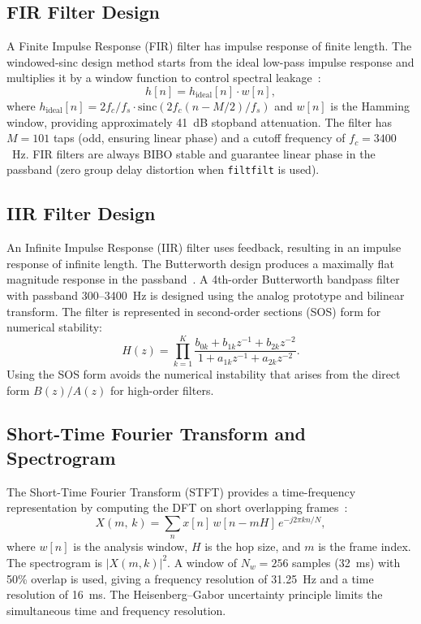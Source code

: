 \documentclass[journal]{IEEEtran}
\begin{document}
\subsection{FIR Filter Design}

A Finite Impulse Response (FIR) filter has impulse response of finite length.
The windowed-sinc design method starts from the ideal low-pass impulse response
and multiplies it by a window function to control spectral leakage~\cite{harris1978}:
\begin{equation}
  h[n] = h_{\text{ideal}}[n] \cdot w[n],
  \label{eq:fir}
\end{equation}
where $h_{\text{ideal}}[n] = 2f_c / f_s \cdot \text{sinc}(2f_c(n - M/2)/f_s)$
and $w[n]$ is the Hamming window, providing approximately 41~dB stopband
attenuation. The filter has $M = 101$ taps (odd, ensuring linear phase) and a
cutoff frequency of $f_c = 3400$~Hz. FIR filters are always BIBO stable and
guarantee linear phase in the passband (zero group delay distortion when
\texttt{filtfilt} is used).

\subsection{IIR Filter Design}

An Infinite Impulse Response (IIR) filter uses feedback, resulting in an
impulse response of infinite length. The Butterworth design produces a maximally
flat magnitude response in the passband~\cite{proakis2007}. A 4th-order
Butterworth bandpass filter with passband 300--3400~Hz is designed using the
analog prototype and bilinear transform. The filter is represented in
second-order sections (SOS) form for numerical stability:
\begin{equation}
  H(z) = \prod_{k=1}^{K} \frac{b_{0k} + b_{1k}z^{-1} + b_{2k}z^{-2}}
                               {1 + a_{1k}z^{-1} + a_{2k}z^{-2}}.
  \label{eq:sos}
\end{equation}
Using the SOS form avoids the numerical instability that arises from the direct
form $B(z)/A(z)$ for high-order filters.

\subsection{Short-Time Fourier Transform and Spectrogram}

The Short-Time Fourier Transform (STFT) provides a time-frequency representation
by computing the DFT on short overlapping frames~\cite{allen1977}:
\begin{equation}
  X(m,\,k) = \sum_{n} x[n]\,w[n - mH]\,e^{-j2\pi kn/N},
  \label{eq:stft}
\end{equation}
where $w[n]$ is the analysis window, $H$ is the hop size, and $m$ is the frame
index. The spectrogram is $|X(m,k)|^2$. A window of $N_w = 256$ samples
(32~ms) with 50\% overlap is used, giving a frequency resolution of 31.25~Hz
and a time resolution of 16~ms. The Heisenberg--Gabor uncertainty principle
limits the simultaneous time and frequency resolution.
\end{document}
